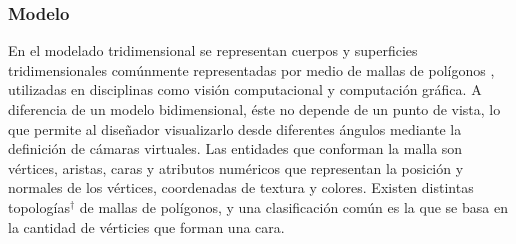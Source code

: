 \subsubsection{Modelo}
En el modelado tridimensional se representan cuerpos y superficies tridimensionales comúnmente representadas por medio de mallas de polígonos \cite{Mesh_building}, utilizadas en disciplinas como visión computacional y computación gráfica. A diferencia de un modelo bidimensional, éste no depende de un punto de vista, lo que permite al diseñador visualizarlo desde diferentes ángulos mediante la definición de cámaras virtuales. Las entidades que conforman la malla son vértices, aristas, caras y atributos numéricos que representan la posición y normales de los vértices, coordenadas de textura y colores. Existen distintas topologías$^\dagger$ de mallas de polígonos, y una clasificación común es la que se basa en la cantidad de vérticies que forman una cara.

